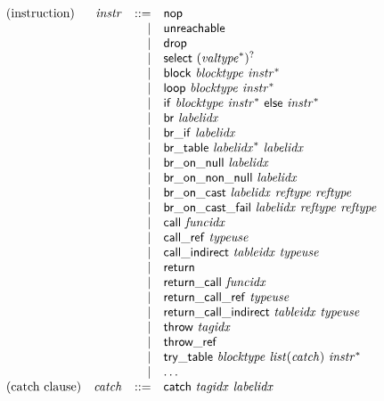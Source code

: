 $$
\begin{array}[t]{@{}lrrl@{}l@{}}
\mbox{(instruction)} & {\mathit{instr}} & ::= & \mathsf{nop} \\
& & | & \mathsf{unreachable} \\
& & | & \mathsf{drop} \\
& & | & \mathsf{select}~{({{\mathit{valtype}}^\ast})^?} \\
& & | & \mathsf{block}~{\mathit{blocktype}}~{{\mathit{instr}}^\ast} \\
& & | & \mathsf{loop}~{\mathit{blocktype}}~{{\mathit{instr}}^\ast} \\
& & | & \mathsf{if}~{\mathit{blocktype}}~{{\mathit{instr}}^\ast}~\mathsf{else}~{{\mathit{instr}}^\ast} \\
& & | & \mathsf{br}~{\mathit{labelidx}} \\
& & | & \mathsf{br\_if}~{\mathit{labelidx}} \\
& & | & \mathsf{br\_table}~{{\mathit{labelidx}}^\ast}~{\mathit{labelidx}} \\
& & | & \mathsf{br\_on\_null}~{\mathit{labelidx}} \\
& & | & \mathsf{br\_on\_non\_null}~{\mathit{labelidx}} \\
& & | & \mathsf{br\_on\_cast}~{\mathit{labelidx}}~{\mathit{reftype}}~{\mathit{reftype}} \\
& & | & \mathsf{br\_on\_cast\_fail}~{\mathit{labelidx}}~{\mathit{reftype}}~{\mathit{reftype}} \\
& & | & \mathsf{call}~{\mathit{funcidx}} \\
& & | & \mathsf{call\_ref}~{\mathit{typeuse}} \\
& & | & \mathsf{call\_indirect}~{\mathit{tableidx}}~{\mathit{typeuse}} \\
& & | & \mathsf{return} \\
& & | & \mathsf{return\_call}~{\mathit{funcidx}} \\
& & | & \mathsf{return\_call\_ref}~{\mathit{typeuse}} \\
& & | & \mathsf{return\_call\_indirect}~{\mathit{tableidx}}~{\mathit{typeuse}} \\
& & | & \mathsf{throw}~{\mathit{tagidx}} \\
& & | & \mathsf{throw\_ref} \\
& & | & \mathsf{try\_table}~{\mathit{blocktype}}~{\mathit{list}}({\mathit{catch}})~{{\mathit{instr}}^\ast} \\
& & | & \dots \\
\mbox{(catch clause)} & {\mathit{catch}} & ::= & \mathsf{catch}~{\mathit{tagidx}}~{\mathit{labelidx}} \\

\end{array}$$
